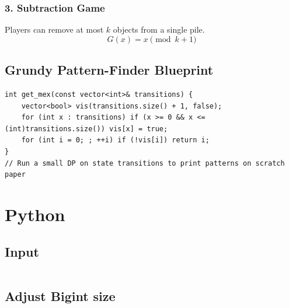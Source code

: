 \subsubsection{3. Subtraction Game}
\par Players can remove at most $k$ objects from a single pile.
$$G(x) = x \pmod{k+1}$$

\subsection{Grundy Pattern-Finder Blueprint}
\begin{verbatim}
int get_mex(const vector<int>& transitions) {
    vector<bool> vis(transitions.size() + 1, false);
    for (int x : transitions) if (x >= 0 && x <= (int)transitions.size()) vis[x] = true;
    for (int i = 0; ; ++i) if (!vis[i]) return i;
}
// Run a small DP on state transitions to print patterns on scratch paper
\end{verbatim}

\section{Python}
  \subsection{Input}
    \inputminted{python3}{library/python/input.py}
  \subsection{Adjust Bigint size}
    \inputminted{python3}{library/python/bigint_size.py}
